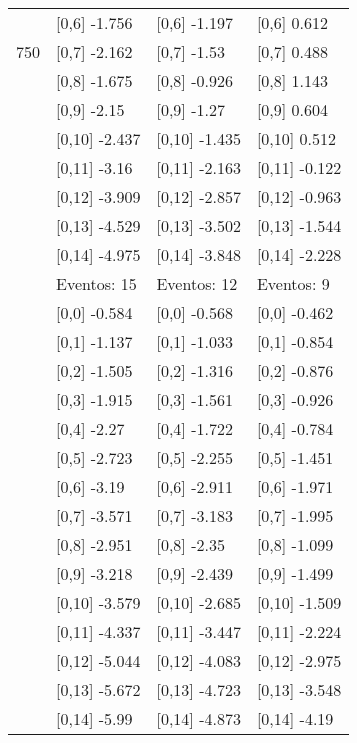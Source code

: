 \begin{table}
\begin{tabular}[t]{llll}
 & {}[0,6] -1.756 & {}[0,6] -1.197 & {}[0,6] 0.612\\
750 & {}[0,7] -2.162 & {}[0,7] -1.53 & {}[0,7] 0.488\\
\addlinespace
 & {}[0,8] -1.675 & {}[0,8] -0.926 & {}[0,8] 1.143\\
 & {}[0,9] -2.15 & {}[0,9] -1.27 & {}[0,9] 0.604\\
 & {}[0,10] -2.437 & {}[0,10] -1.435 & {}[0,10] 0.512\\
 & {}[0,11] -3.16 & {}[0,11] -2.163 & {}[0,11] -0.122\\
 & {}[0,12] -3.909 & {}[0,12] -2.857 & {}[0,12] -0.963\\
\addlinespace
 & {}[0,13] -4.529 & {}[0,13] -3.502 & {}[0,13] -1.544\\
 & {}[0,14] -4.975 & {}[0,14] -3.848 & {}[0,14] -2.228\\
 & Eventos:  15 & Eventos:  12 & Eventos:  9\\
 & {}[0,0] -0.584 & {}[0,0] -0.568 & {}[0,0] -0.462\\
 & {}[0,1] -1.137 & {}[0,1] -1.033 & {}[0,1] -0.854\\
\addlinespace
 & {}[0,2] -1.505 & {}[0,2] -1.316 & {}[0,2] -0.876\\
 & {}[0,3] -1.915 & {}[0,3] -1.561 & {}[0,3] -0.926\\
 & {}[0,4] -2.27 & {}[0,4] -1.722 & {}[0,4] -0.784\\
 & {}[0,5] -2.723 & {}[0,5] -2.255 & {}[0,5] -1.451\\
 & {}[0,6] -3.19 & {}[0,6] -2.911 & {}[0,6] -1.971\\
\addlinespace
1000 & {}[0,7] -3.571 & {}[0,7] -3.183 & {}[0,7] -1.995\\
 & {}[0,8] -2.951 & {}[0,8] -2.35 & {}[0,8] -1.099\\
 & {}[0,9] -3.218 & {}[0,9] -2.439 & {}[0,9] -1.499\\
 & {}[0,10] -3.579 & {}[0,10] -2.685 & {}[0,10] -1.509\\
 & {}[0,11] -4.337 & {}[0,11] -3.447 & {}[0,11] -2.224\\
\addlinespace
 & {}[0,12] -5.044 & {}[0,12] -4.083 & {}[0,12] -2.975\\
 & {}[0,13] -5.672 & {}[0,13] -4.723 & {}[0,13] -3.548\\
 & {}[0,14] -5.99 & {}[0,14] -4.873 & {}[0,14] -4.19\\
\bottomrule
\end{tabular}
\end{table}
